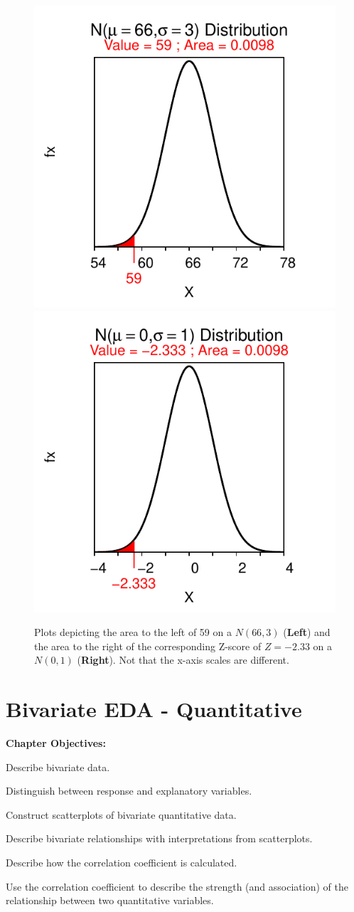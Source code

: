 \documentclass[10pt,openany]{book}\usepackage[]{graphicx}\usepackage[]{color}
\newenvironment{knitrout}{}{} %
\begin{document}
\begin{knitrout}
\color{fgcolor}\begin{figure}[hbtp]

{\centering \includegraphics[width=.4\linewidth]{Figs/NormStandardizingEx-1} 
\includegraphics[width=.4\linewidth]{Figs/NormStandardizingEx-2} 

}

\caption{Plots depicting the area to the left of 59 on a $N(66,3)$ (\textbf{Left}) and the area to the right of the corresponding Z-score of $Z=-2.33$ on a $N(0,1)$ (\textbf{Right}).  Not that the x-axis scales are different.}\label{fig:NormStandardizingEx}
\end{figure}


\end{knitrout}



\chapter{Bivariate EDA - Quantitative} \label{chap:BivEDAQuant}
\begin{ChapObj}{\boxwidth}
  \textbf{Chapter Objectives:}
  \begin{Enumerate}
    \item Describe bivariate data.
    \item Distinguish between response and explanatory variables.
    \item Construct scatterplots of bivariate quantitative data.
    \item Describe bivariate relationships with interpretations from scatterplots.
    \item Describe how the correlation coefficient is calculated.
    \item Use the correlation coefficient to describe the strength (and association) of the relationship between two quantitative variables.
  \end{Enumerate}
\end{ChapObj}
\end{document}
